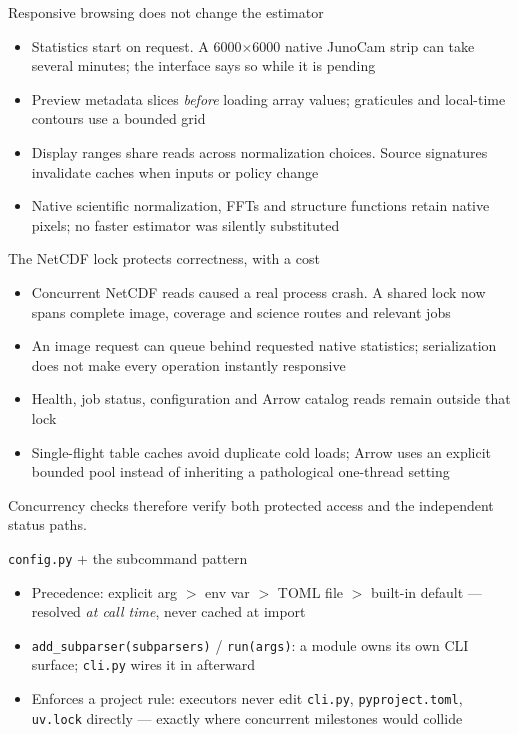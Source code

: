 \documentclass[aspectratio=169,11pt]{beamer}
\newcommand{\currevsec}{}
\newcommand{\revsec}[1]{\gdef\currevsec{#1}}
\begin{document}
\begin{frame}{Responsive browsing does not change the estimator}
  \revsec{4.16}
\begin{itemize}
    \item Statistics start on request. A 6000$\times$6000 native JunoCam strip can take several minutes; the interface says so while it is pending
    \item Preview metadata slices \emph{before} loading array values; graticules and local-time contours use a bounded grid
    \item Display ranges share reads across normalization choices. Source signatures invalidate caches when inputs or policy change
    \item Native scientific normalization, FFTs and structure functions retain native pixels; no faster estimator was silently substituted
  \end{itemize}
\end{frame}

\begin{frame}{The NetCDF lock protects correctness, with a cost}
  \revsec{4.16}
\begin{itemize}
    \item Concurrent NetCDF reads caused a real process crash. A shared lock now spans complete image, coverage and science routes and relevant jobs
    \item An image request can queue behind requested native statistics; serialization does not make every operation instantly responsive
    \item Health, job status, configuration and Arrow catalog reads remain outside that lock
    \item Single-flight table caches avoid duplicate cold loads; Arrow uses an explicit bounded pool instead of inheriting a pathological one-thread setting
  \end{itemize}
  \vspace{0.2cm}
  Concurrency checks therefore verify both protected access and the independent status paths.
\end{frame}

\begin{frame}{\texttt{config.py} + the subcommand pattern}
  \revsec{4.17}
  \begin{itemize}
    \item Precedence: explicit arg $>$ env var $>$ TOML file $>$ built-in default --- resolved \emph{at call time}, never cached at import
    \item \texttt{add\_subparser(subparsers)} / \texttt{run(args)}: a module owns its own CLI surface; \texttt{cli.py} wires it in afterward
    \item Enforces a project rule: executors never edit \texttt{cli.py}, \texttt{pyproject.toml}, \texttt{uv.lock} directly --- exactly where concurrent milestones would collide
  \end{itemize}
\end{frame}
\end{document}
